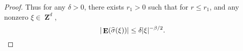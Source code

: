 \documentclass[12pt,reqno]{article}
\numberwithin{equation}{section}
\DeclareMathOperator{\ZZ}{\mathbf{Z}}
\DeclareMathOperator{\TT}{\mathbf{T}}
\numberwithin{theorem}{section}
\DeclareMathOperator{\EE}{\mathbf{E}}
\begin{document}
\begin{proof}
    Thus for any $\delta > 0$, there exists $r_1 > 0$ such that for $r \leq r_1$, and any nonzero $\xi \in \ZZ^d$,
    \[ |\EE(\widehat{\sigma}(\xi))| \leq \delta |\xi|^{-\beta/2}. \qedhere \]

\end{proof}
\end{document}
